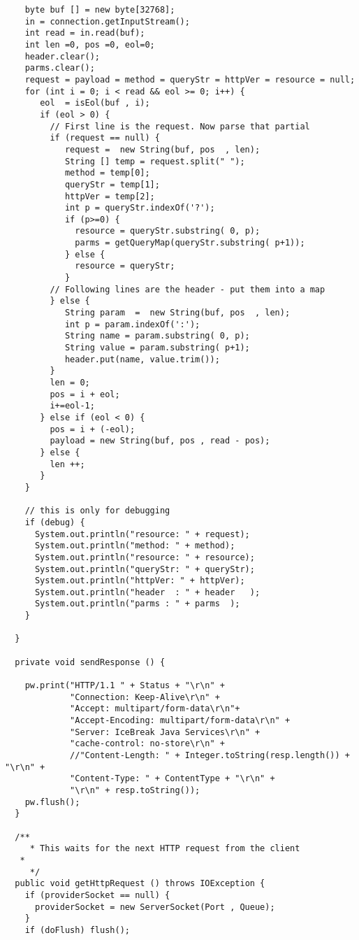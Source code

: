 \begin{lstlisting}
    byte buf [] = new byte[32768];
    in = connection.getInputStream();
    int read = in.read(buf);
    int len =0, pos =0, eol=0;
    header.clear();
    parms.clear();
    request = payload = method = queryStr = httpVer = resource = null;
    for (int i = 0; i < read && eol >= 0; i++) {
       eol  = isEol(buf , i);
       if (eol > 0) {
         // First line is the request. Now parse that partial
         if (request == null) {
            request =  new String(buf, pos  , len);
            String [] temp = request.split(" ");
            method = temp[0];
            queryStr = temp[1];
            httpVer = temp[2];
            int p = queryStr.indexOf('?');
            if (p>=0) {
              resource = queryStr.substring( 0, p);
              parms = getQueryMap(queryStr.substring( p+1));
            } else {
              resource = queryStr;
            }
         // Following lines are the header - put them into a map
         } else {
            String param  =  new String(buf, pos  , len);
            int p = param.indexOf(':');
            String name = param.substring( 0, p);
            String value = param.substring( p+1);
            header.put(name, value.trim());
         }
         len = 0;
         pos = i + eol;
         i+=eol-1;
       } else if (eol < 0) {
         pos = i + (-eol);
         payload = new String(buf, pos , read - pos);
       } else {
         len ++;
       }
    }

    // this is only for debugging
    if (debug) {
      System.out.println("resource: " + request);
      System.out.println("method: " + method);
      System.out.println("resource: " + resource);
      System.out.println("queryStr: " + queryStr);
      System.out.println("httpVer: " + httpVer);
      System.out.println("header  : " + header   );
      System.out.println("parms : " + parms  );
    }

  }

  private void sendResponse () {   
    
    pw.print("HTTP/1.1 " + Status + "\r\n" +
             "Connection: Keep-Alive\r\n" +
             "Accept: multipart/form-data\r\n"+
             "Accept-Encoding: multipart/form-data\r\n" +
             "Server: IceBreak Java Services\r\n" +
             "cache-control: no-store\r\n" +
             //"Content-Length: " + Integer.toString(resp.length()) + "\r\n" +
             "Content-Type: " + ContentType + "\r\n" +
             "\r\n" + resp.toString());
    pw.flush();
  }

  /**
	 * This waits for the next HTTP request from the client
   *
	 */
  public void getHttpRequest () throws IOException {
    if (providerSocket == null) {
      providerSocket = new ServerSocket(Port , Queue);
    }
    if (doFlush) flush();


\end{lstlisting}
